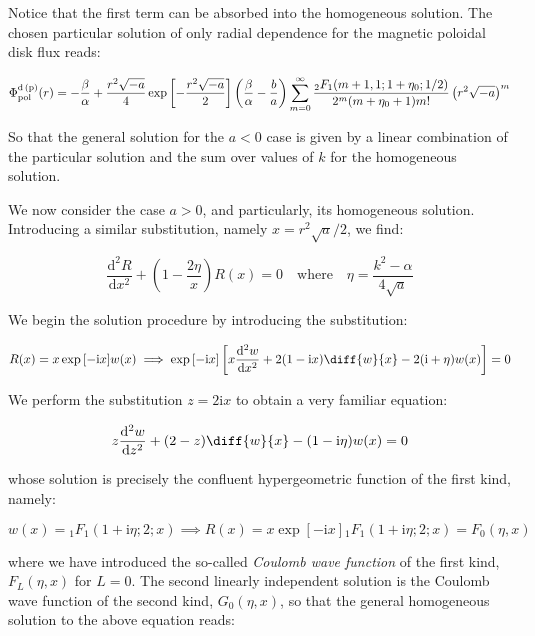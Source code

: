 Notice that the first term can be absorbed into the homogeneous solution. The chosen particular solution of only radial dependence for the magnetic poloidal disk flux reads:

\begin{equation}
    \Phi_\text{pol}^\text{d\,(p)}(r)=-\frac{\beta}{\alpha}+\frac{r^2\sqrt{-a}}{4}\exp{\left[-\frac{r^2\sqrt{-a}}{2}\right]}\left(\frac{\beta}{\alpha}-\frac{b}{a}\right)\sum_{m=0}^\infty\frac{{_2F_1}(m+1,1;1+\eta_0;1/2)}{2^m(m+\eta_0+1)m!}\left(r^2\sqrt{-a}\right)^m
\end{equation}

So that the general solution for the $a<0$ case is given by a linear combination of the particular solution and the sum over values of $k$ for the homogeneous solution.

\quad We now consider the case $a>0$, and particularly, its homogeneous solution. Introducing a similar substitution, namely $x=r^2\sqrt{a}/2$, we find:

\begin{equation}
    \frac{\mathrm{d}^2R}{\mathrm{d}x^2}+\left(1-\frac{2\eta}{x}\right)R(x)=0\quad\text{where}\quad\eta=\frac{k^2-\alpha}{4\sqrt{a}}
\end{equation}

We begin the solution procedure by introducing the substitution:

\begin{equation}
    R(x)=x\exp{\left[-\mathrm{i}x\right]}w(x)\implies\exp{\left[-\mathrm{i}x\right]}\left[x\frac{\mathrm{d}^2w}{\mathrm{d}x^2}+2(1-\mathrm{i}x)\diff{w}{x}-2(\mathrm{i}+\eta)w(x)\right]=0
\end{equation}

We perform the substitution $z=2\mathrm{i}x$ to obtain a very familiar equation:

\begin{equation}
    z\frac{\mathrm{d}^2w}{\mathrm{d}z^2}+(2-z)\diff{w}{x}-(1-\mathrm{i}\eta)w(x)=0
\end{equation}

whose solution is precisely the confluent hypergeometric function of the first kind, namely:

\begin{equation}
    w(x)={_1F_1}(1+\mathrm{i}\eta;2;x)\implies R(x)=x\exp{\left[-\mathrm{i}x\right]}{_1F_1}(1+\mathrm{i}\eta;2;x)=F_0(\eta,x)
\end{equation}

where we have introduced the so-called \textit{Coulomb wave function} of the first kind, $F_L(\eta,x)$ for $L=0$. The second linearly independent solution is the Coulomb wave function of the second kind, $G_0(\eta, x)$, so that the general homogeneous solution to the above equation reads:

